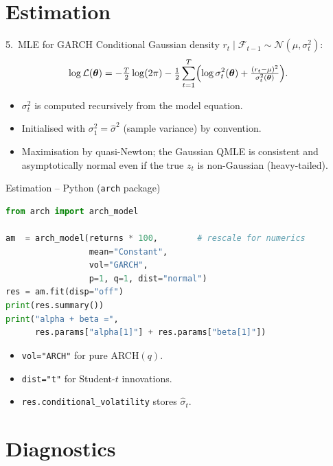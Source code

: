 \documentclass[aspectratio=169]{beamer}
\begin{document}
\section{Estimation}

\begin{frame}{5.~MLE for GARCH}
  Conditional Gaussian density
  $r_t \mid \mathcal F_{t-1} \sim \mathcal N(\mu, \sigma_t^2)$:
  \[
    \log \mathcal L(\bm\theta)
    = -\tfrac{T}{2} \log(2 \pi)
      -\tfrac{1}{2} \sum_{t = 1}^{T}
          \Bigl(
              \log \sigma_t^2(\bm\theta)
              + \tfrac{(r_t - \mu)^2}{\sigma_t^2(\bm\theta)}
          \Bigr).
  \]
  \begin{itemize}
    \item $\sigma_t^2$ is computed recursively from the model
          equation.
    \item Initialised with $\sigma_1^2 = \widehat\sigma^2$ (sample
          variance) by convention.
    \item Maximisation by quasi-Newton; the Gaussian QMLE is
          consistent and asymptotically normal even if the true
          $z_t$ is non-Gaussian (heavy-tailed).
  \end{itemize}
\end{frame}

\begin{frame}[fragile]{Estimation -- Python (\texttt{arch} package)}
\begin{lstlisting}[language=Python]
from arch import arch_model

am  = arch_model(returns * 100,        # rescale for numerics
                 mean="Constant",
                 vol="GARCH",
                 p=1, q=1, dist="normal")
res = am.fit(disp="off")
print(res.summary())
print("alpha + beta =",
      res.params["alpha[1]"] + res.params["beta[1]"])
\end{lstlisting}
  \begin{itemize}
    \item \texttt{vol="ARCH"} for pure ARCH$(q)$.
    \item \texttt{dist="t"} for Student-$t$ innovations.
    \item \texttt{res.conditional\_volatility} stores
          $\widehat\sigma_t$.
  \end{itemize}
\end{frame}

\section{Diagnostics}
\end{document}
